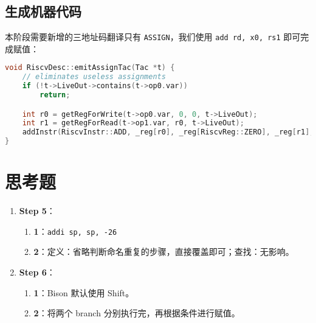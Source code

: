 \documentclass[a4paper]{article}
\begin{document}
\subsection{生成机器代码}

本阶段需要新增的三地址码翻译只有 \texttt{ASSIGN}，我们使用 \texttt{add rd, x0, rs1} 即可完成赋值：

\begin{lstlisting}[language=c++]
void RiscvDesc::emitAssignTac(Tac *t) {
    // eliminates useless assignments
    if (!t->LiveOut->contains(t->op0.var))
        return;

    int r0 = getRegForWrite(t->op0.var, 0, 0, t->LiveOut);
    int r1 = getRegForRead(t->op1.var, r0, t->LiveOut);
    addInstr(RiscvInstr::ADD, _reg[r0], _reg[RiscvReg::ZERO], _reg[r1], 0, EMPTY_STR, NULL);
}    
\end{lstlisting}

\section{思考题}

\begin{enumerate}
    \item \textbf{Step 5}：\begin{enumerate}
        \item \textbf{1}：\texttt{addi sp, sp, -26}
        \item \textbf{2}：定义：省略判断命名重复的步骤，直接覆盖即可；查找：无影响。
    \end{enumerate}
    \item \textbf{Step 6}：\begin{enumerate}
        \item \textbf{1}：Bison 默认使用 Shift。
        \item \textbf{2}：将两个 branch 分别执行完，再根据条件进行赋值。
    \end{enumerate}
\end{enumerate}
\end{document}
